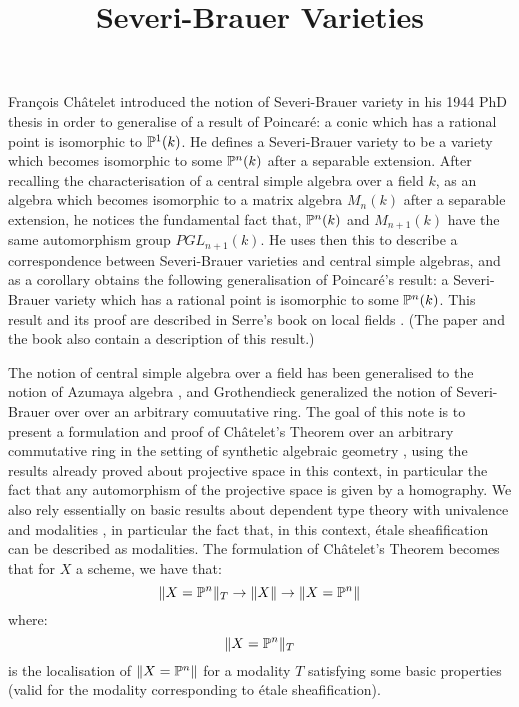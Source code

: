 \documentclass{../util/zariski}
\title{Severi-Brauer Varieties}
\begin{document}
\maketitle


{F}ran\c cois {C}h\^atelet introduced the notion of Severi-Brauer variety in his 1944 PhD thesis
\cite{chatelet44} in order to generalise of a result of Poincar\'e: a conic which has a rational point is isomorphic to $\mathbb{P}^1(k)$.
He defines a Severi-Brauer variety to be a variety which becomes isomorphic to some $\mathbb{P}^n(k)$ after
a separable extension. After recalling the characterisation of a central simple algebra over a field $k$, as
an algebra which becomes isomorphic to a matrix algebra $M_n(k)$ after a separable extension, he notices the fundamental
fact that, $\mathbb{P}^{n}(k)$ and $M_{n+1}(k)$ have the same automorphism group $PGL_{n+1}(k)$. He uses then this
to describe a correspondence between Severi-Brauer varieties and central simple algebras, and as a corollary
obtains the following generalisation of Poincar\'e's result: a Severi-Brauer variety which has a rational point
is isomorphic to some $\mathbb{P}^{n}(k)$. This result and its proof are described in Serre's book on local fields \cite{serre62}.
(The paper \cite{colliot88} and the book \cite{gille2017central} also contain a description of this result.)

The notion of central simple algebra over a field
has been generalised to the notion of Azumaya algebra  \cite{azumaya51}, and
Grothendieck \cite{grothendieck68} generalized the notion of Severi-Brauer over over an arbitrary comuutative ring.
The goal of this note is to present a formulation and proof of Ch\^atelet's Theorem over an arbitrary commutative ring
in the setting of synthetic algebraic geometry \cite{draft}, using the results already proved about projective
space \cite{sag-projective} in this context, in particular the fact that any automorphism of the projective space is given
by a homography. We also rely essentially on basic results about dependent type theory with univalence \cite{hott}
and modalities \cite{modalities}, in particular the fact that, in this context, \'etale sheafification can be described
as modalities. The formulation of Ch\^atelet's Theorem becomes that for $X$ a scheme, we have that:
\[\lVert X=\mathbb{P}^n \rVert_{T} \to \lVert X \rVert \to \lVert X=\mathbb{P}^n \rVert\]
where:
\[\lVert X=\mathbb{P}^n \rVert_{T}\]
is the localisation of $\lVert X=\mathbb{P}^n \rVert$ for a modality $T$ satisfying some basic properties (valid for the modality
corresponding to \'etale sheafification).
\end{document}
